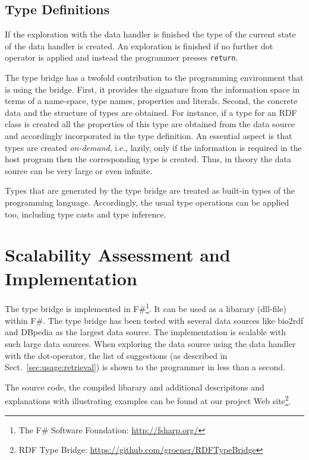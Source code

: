 \documentclass{llncs} %
\newcommand{\fs}{\textsf{F\#}\xspace}
\begin{document}
\subsection{Type Definitions}

If the exploration with the data handler is finished the type of the current state of
the data handler is created. An exploration is finished if no further dot operator is
applied and instead the programmer presses \texttt{return}.

The type bridge has a twofold contribution to the programming
environment that is using the bridge. First, it provides the signature from
the information space in terms of a name-space, type names, properties and literals.
Second, the concrete data and the structure of types are obtained. For instance, if
a type for an RDF class is created all the properties of this type are obtained from the
data source and accordingly incorporated in the type definition. An essential aspect is that types are created \emph{on-demand},
i.e., lazily, only if the information is required in the host program then the corresponding type is created. 
Thus, in theory the data source can be very large or even infinite.

Types that are generated by the type bridge are treated as built-in types of the programming language.
Accordingly, the usual type operations can be applied too, including type casts and type inference.


\section{Scalability Assessment and Implementation}
\label{sec:eval}

The type bridge is implemented in \fs\footnote{The \fs Software Foundation: \url{http://fsharp.org/}}. It can be used as a libarary (dll-file) within \fs. 
The type bridge has been tested with several data sources like bio2rdf and DBpedia as the largest data source.
The implementation is scalable with such large data sources. When exploring the data
source using the data handler with the dot-operator, the list of suggestions (as described in Sect.~\ref{sec:usage:retrieval})
is shown to the programmer in less than a second.

The source code, the compiled libarary and additional descripitons
and explanations with illustrating examples can be found at our project Web site\footnote{RDF Type Bridge: \url{https://github.com/groener/RDFTypeBridge}}.
 
\end{document}
